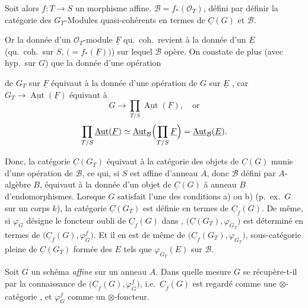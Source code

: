 \documentclass[11pt,a4paper]{article}
\begin{document}
Soit alors $f : T \to S$ un morphisme affine. 
$\mathcal{B} = f_{*}(\mathcal{O}_{T})$, \struck{\ill{}} défini par
 définir la catégorie des $G_{T}$-Modules
quasi-cohérents en termes de $\underline{C}(G)$ et $\mathcal{B}$.

Or la donnée d'un $\mathcal{O}_{T}$-module $\underline{F}$ qu.\ coh.\ revient
à la donnée d'un $\underline{E}$ (qu.\ coh.\ sur $S$,
$\bigl(= f_{*}(\underline{F})\bigr)$) sur lequel $\mathcal{B}$ opère. On
constate de plus (avec hyp.\ sur $G$) que la donnée d'une opération

de $G_{T}$ sur $\underline{F}$ équivaut à la donnée d'une opération de $G$ sur
$\underline{E}$ , car
$G_{T} \to \underline{\operatorname{Aut}}(\underline{F})$ équivaut à
\[
G \longrightarrow \prod_{T/S} \underline{\operatorname{Aut}}(\underline{F}) ,
\quad \text{or}
\]
\[
\prod_{T/S} \underline{\operatorname{Aut}}(\underline{F}) \simeq
\underline{\operatorname{Aut}}_{\mathcal{B}}\Bigl(\prod_{T/S} \underline{F}\Bigr)
= \underline{\operatorname{Aut}}_{\mathcal{B}}(\underline{E}) .
\]

Donc, la catégorie $\underline{C}(G_{T})$ équivaut à la catégorie des objets
de $\underline{C}(G)$ munis d'une opération de $\mathcal{B}$, ce qui, si $S$
est affine d'anneau $A$, donc $\mathcal{B}$ défini par $A$-algèbre $B$,
équivaut à la  donnée d'un objet de $\underline{C}(G)$ à anneau
$B$ d'endomorphismes. Lorsque $G$ satisfait l'une des conditions a) ou b)
(p.~ex.\ $G$ \ill{} sur un corps $k$), la catégorie $\underline{C}(G_{T})$
est définie en termes de $\underline{C}_{f}(G)$. De même, si $\varphi_{G}$
désigne le foncteur oubli de $\underline{C}_{f}(G)$ 
dans \ill{},
$\bigl(\underline{C}(G_{T}), \varphi_{G_{T}}\bigr)$ est déterminé en termes de
$\bigl(\underline{C}_{f}(G), \varphi_{G}^{f}\bigr)$. Et il en est de même de
$\bigl(\underline{C}_{f}(G_{T}), \varphi_{G_{T}}\bigr)$, sous-catégorie pleine
de $\underline{C}(G_{T})$ formée des $E$ tels que $\varphi_{G_{T}}(E)$
 sur $\mathcal{B}$.


Soit $G$ un schéma \emph{affine} sur un anneau $A$. Dans quelle mesure $G$ se
récupère-t-il par la connaissance de
$\bigl(\underline{C}_{f}(G), \varphi_{G}^{f}\bigr)$, i.e.\
$\underline{C}_{f}(G)$ est regardé comme une $\otimes$-catégorie
\add{par $\otimes$ \ill{}}, et $\varphi_{G}^{f}$ comme un
$\otimes$-foncteur.
\end{document}

